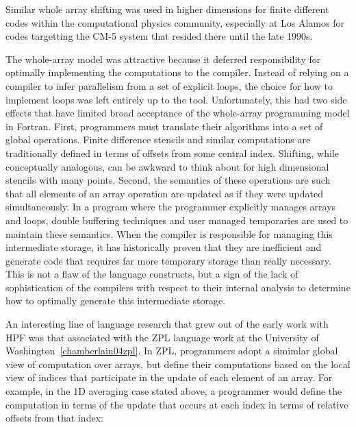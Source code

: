 Similar whole array shifting was used in higher dimensions for finite
different codes within the computational physics community, especially
at Los Alamos for codes targetting the CM-5 system that resided there until the
late 1990s.  

The whole-array model was attractive because it deferred
responsibility for optimally implementing the computations to the
compiler.  Instead of relying on a compiler to infer parallelism from
a set of explicit loops, the choice for how to implement loops was
left entirely up to the tool.  Unfortunately, this had two side
effects that have limited broad acceptance of the whole-array
programming model in Fortran.  First, programmers must translate their
algorithms into a set of global operations.  Finite difference
stencils and similar computations are traditionally defined in terms
of offsets from some central index.  Shifting, while conceptually
analogous, can be awkward to think about for high dimensional stencils
with many points.  Second, the semantics of these operations are such
that all elements of an array operation are updated as if they were
updated simultaneously.  In a program where the programmer explicitly
manages arrays and loops, double buffering techniques and user managed
temporaries are used to maintain these semantics.  When the compiler
is responsible for managing this intermediate storage, it has
historically proven that they are inefficient and generate code that
requires far more temporary storage than really necessary.  This is
not a flaw of the language constructs, but a sign of the lack of
sophistication of the compilers with respect to their internal
analysis to determine how to optimally generate this intermediate
storage.

An interesting line of language research that grew out of the early work
with HPF was that associated with the ZPL language work at the University
of Washington~\ref{chamberlain04zpl}.  In ZPL, programmers adopt a simimlar
global view of computation over arrays, but define their computations based
on the local view of indices that participate in the update of each element of
an array.  For example, in the 1D averaging case stated above, a programmer would
define the computation in terms of the update that occurs at each index in terms
of relative offsets from that index:

